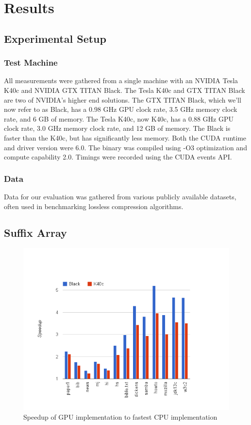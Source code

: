 \chapter{Results}
\label{chap:results}

\section{Experimental Setup}
\subsection{Test Machine}
All measurements were gathered from a single machine with an NVIDIA Tesla K40c and NVIDIA GTX TITAN Black.
The Tesla K40c and GTX TITAN Black are two of NVIDIA's higher end solutions.
The GTX TITAN Black, which we'll now refer to as Black, has a 0.98 GHz GPU clock rate, 3.5 GHz memory clock rate, and 6 GB of memory.
The Tesla K40c, now K40c, has a 0.88 GHz GPU clock rate, 3.0 GHz memory clock rate, and 12 GB of memory.
The Black is faster than the K40c, but has significantly less memory.
Both the CUDA runtime and driver version were 6.0.
The binary was compiled using -O3 optimization and compute capability 2.0.
Timings were recorded using the CUDA events API.

\subsection{Data}

Data for our evaluation was gathered from various publicly available datasets, often used in benchmarking lossless compression algorithms.

\section{Suffix Array}

\begin{figure}[ht!]
\centering
\includegraphics[width=1.0\textwidth]{images/saresult.png}
\caption{Speedup of GPU implementation to fastest CPU implementation}
\label{fig:saresult}
\end{figure}

